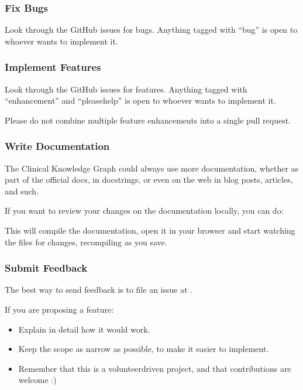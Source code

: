 \documentclass[letterpaper,10pt,english]{sphinxmanual}
\begin{document}
\subsubsection{Fix Bugs}
\label{\detokenize{MANIFEST:fix-bugs}}
Look through the GitHub issues for bugs. Anything tagged with “bug” is open to whoever wants to implement it.


\subsubsection{Implement Features}
\label{\detokenize{MANIFEST:implement-features}}
Look through the GitHub issues for features. Anything tagged with “enhancement” and “please\sphinxhyphen{}help” is open to whoever wants to implement it.

Please do not combine multiple feature enhancements into a single pull request.


\subsubsection{Write Documentation}
\label{\detokenize{MANIFEST:write-documentation}}
The Clinical Knowledge Graph could always use more documentation, whether as part of the official docs, in docstrings, or even on the web in blog posts, articles, and such.

If you want to review your changes on the documentation locally, you can do:

This will compile the documentation, open it in your browser and start watching the files for changes, recompiling as you save.


\subsubsection{Submit Feedback}
\label{\detokenize{MANIFEST:submit-feedback}}
The best way to send feedback is to file an issue at .

If you are proposing a feature:
\begin{itemize}
\item {} 
Explain in detail how it would work.

\item {} 
Keep the scope as narrow as possible, to make it easier to implement.

\item {} 
Remember that this is a volunteer\sphinxhyphen{}driven project, and that contributions are welcome :)

\end{itemize}
\end{document}
